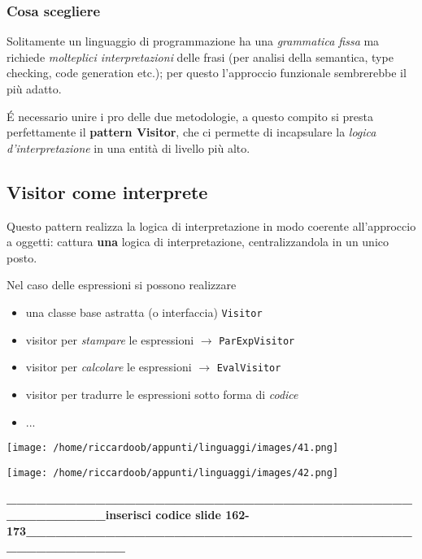 \subsubsection{Cosa scegliere}
Solitamente un linguaggio di programmazione ha una \textit{grammatica fissa} ma richiede \textit{molteplici interpretazioni} delle frasi (per analisi della semantica, type checking, code generation etc.); per questo l'approccio funzionale sembrerebbe il più adatto.

É necessario unire i pro delle due metodologie, a questo compito si presta perfettamente il \textbf{pattern Visitor}, che ci permette di incapsulare la \textit{logica d'interpretazione} in una entità di livello più alto.

\subsection{Visitor come interprete}
Questo pattern realizza la logica di interpretazione in modo coerente all'approccio a oggetti: cattura \textbf{una} logica di interpretazione, centralizzandola in un unico posto.

Nel caso delle espressioni si possono realizzare
\begin{itemize}
    \item una classe base astratta (o interfaccia) \texttt{Visitor}
    \item visitor per \textit{stampare} le espressioni $\rightarrow$ \texttt{ParExpVisitor}
    \item visitor per \textit{calcolare} le espressioni $\rightarrow$ \texttt{EvalVisitor}
    \item visitor per tradurre le espressioni sotto forma di \textit{codice}
    \item ...
\end{itemize}

\begin{multicols}{2}
    \begin{multicolfigure}
        \centering
        \texttt{[image: /home/riccardoob/appunti/linguaggi/images/41.png]}
    \end{multicolfigure}
    \begin{multicolfigure}
        \centering
        \texttt{[image: /home/riccardoob/appunti/linguaggi/images/42.png]}
    \end{multicolfigure}
    
\end{multicols}

\textbf{\_\_\_\_\_\_\_\_\_\_\_\_\_\_\_\_\_\_\_\_\_\_\_\_\_\_\_\_\_\_\_\_\_\_\_\_\_\_\_\_\_\_\_\_\_\_\_\_\_\_\_inserisci codice slide 162-173\_\_\_\_\_\_\_\_\_\_\_\_\_\_\_\_\_\_\_\_\_\_\_\_\_\_\_\_\_\_\_\_\_\_\_\_\_\_\_\_\_\_\_\_\_\_\_\_\_\_\_}
























